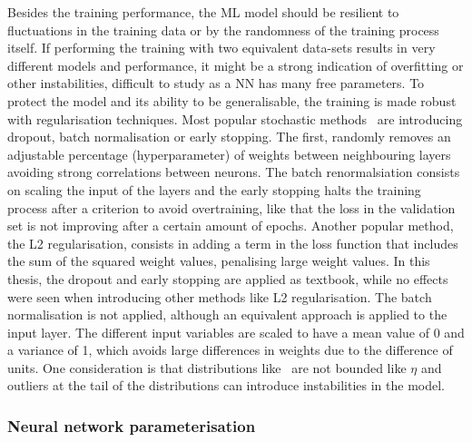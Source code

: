 Besides the training performance, the ML model should be resilient to fluctuations in the training data or by the randomness of the training process itself. If performing the training with two equivalent data-sets results in very different models and performance, it might be a strong indication of overfitting or other instabilities, difficult to study as a NN has many free parameters. To protect the model and its ability to be generalisable, the training is made robust with regularisation techniques. Most popular stochastic methods~\cite{JMLR:v15:srivastava14a,batchnorm,earlystop} are introducing dropout, batch normalisation or early stopping. The first, randomly removes an adjustable percentage (hyperparameter) of weights between neighbouring layers avoiding strong correlations between neurons. The batch renormalsiation consists on scaling the input of the layers and the early stopping halts the training process after a criterion to avoid overtraining, like that the loss in the validation set is not improving after a certain amount of epochs. Another popular method, the L2 regularisation, consists in adding a term in the loss function that includes the sum of the squared weight values, penalising large weight values. In this thesis, the dropout and early stopping are applied as textbook, while no effects were seen when introducing other methods like L2 regularisation. The batch normalisation is not applied, although an equivalent approach is applied to the input layer. The different input variables are scaled to have a mean value of 0 and a variance of 1, which avoids large differences in weights due to the difference of units. One consideration is that distributions like \pT\ are not bounded like $\eta$ and outliers at the tail of the distributions can introduce instabilities in the model.

\subsubsection{Neural network parameterisation}

